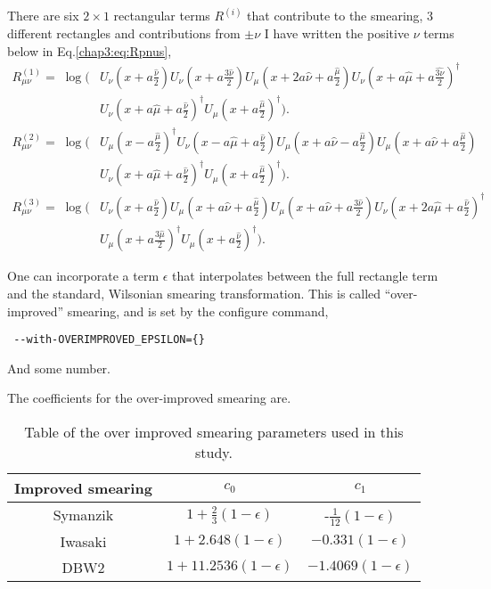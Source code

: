 \documentclass[12pt]{article}
\begin{document}
There are six $2\times1$ rectangular terms $R^{(i)}$ that contribute to the smearing, 3 different rectangles and contributions from $\pm\nu$ I have written the
positive $\nu$ terms below in Eq.\ref{chap3:eq:Rpnus},
\begin{equation}\label{chap3:eq:Rpnus}
\begin{aligned}
R^{(1)}_{\mu\nu} = \;
\log\bigg(&U_\nu\left(x+a\frac{\hat{\nu}}{2}\right)U_\nu\left(x+a\frac{3\hat{\nu}}{2}\right)
U_\mu\left(x+2a\hat{\nu} +
a\frac{\hat{\mu}}{2}\right)U_\nu\left(x+a\hat\mu+a\frac{\hat{3\nu}}{2}\right)^{\dagger} \\
&U_\nu\left(x+a\hat\mu+a\frac{\hat{\nu}}{2}\right)^{\dagger}U_\mu\left(x+a\frac{\hat\mu}{2}\right)^{
\dagger}\bigg).  \\
R^{(2)}_{\mu\nu} =\; \log\bigg(&U_\mu\left(x-a\frac{\hat\mu}{2}\right)^{\dagger}
U_\nu\left(x-a\hat\mu + a\frac{\hat\nu}{2}\right) U_\mu\left(x +
a\hat\nu - a\frac{\hat\mu}{2}\right)U_\mu\left(x+a\hat\nu + a\frac{\hat\mu}{2}\right) \\
&U_\nu\left(x+a\hat\mu + a\frac{\hat\nu}{2}\right)^{\dagger}U_\mu\left(x+a\frac{\hat\mu}{2}\right)^{
\dagger}\bigg).  \\
R^{(3)}_{\mu\nu} =\;
\log\bigg(&U_{\nu}\left(x+a\frac{\hat\nu}{2}\right)U_{\mu}\left(x+a\hat\nu+a\frac{\hat\mu}{2}\right)
U_{\mu}\left(x+a\hat\nu+a\frac{3\hat\nu}{2}\right)U_{\nu}\left(x+2a\hat\mu+
a\frac{\hat\nu}{2}\right)^{\dagger} \\
&U_{\mu}\left(x+a\frac{3\hat\mu}{2}\right)^{\dagger}U_{\mu}
\left(x+a\frac{\hat\nu}{2}\right)^{\dagger}\bigg).
\end{aligned}\end{equation}

One can incorporate a term $\epsilon$ that interpolates between the full rectangle term and the standard, Wilsonian smearing transformation. This is called ``over-improved'' smearing, and is set by the configure command,
\begin{verbatim}
 --with-OVERIMPROVED_EPSILON={}
\end{verbatim}
And some number.

The coefficients for the over-improved smearing are.
\begin{table}[h!]
\begin{center}
\begin{tabular}{|c|c|c|}
\hline
Improved smearing & $c_0$ & $c_1$ \\
\hline
\rule{0pt}{2.6ex}
Symanzik & $1+\frac{2}{3}(1-\epsilon)$ & -$\frac{1}{12}(1-\epsilon)$ \\
Iwasaki & $1+2.648(1-\epsilon)$ & $-0.331(1-\epsilon)$ \\
DBW2 & $1+11.2536(1-\epsilon)$ & $-1.4069(1-\epsilon)$ \\
\hline
\end{tabular}
\caption{Table of the
over improved smearing parameters used in this study.}\label{chap3:tab:oversmearing_params}
\end{center}
\end{table}
\end{document}
